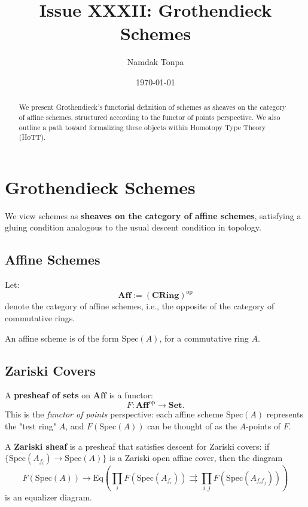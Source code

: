 \documentclass{article}
\begin{document}
\title{Issue XXXII: Grothendieck Schemes}
\author{Namdak Tonpa}
\date{\today}

\maketitle

\begin{abstract}
We present Grothendieck’s functorial definition of schemes as sheaves on the category of affine schemes, structured according to the functor of points perspective. We also outline a path toward formalizing these objects within Homotopy Type Theory (HoTT).
\end{abstract}

\section{Grothendieck Schemes}

We view schemes as \textbf{sheaves on the category of affine schemes}, satisfying a gluing condition analogous to the usual descent condition in topology.

\subsection{Affine Schemes}

Let:
\[
\mathbf{Aff} := (\mathbf{CRing})^{\mathrm{op}}
\]
denote the category of affine schemes, i.e., the opposite of the category of commutative rings.

An affine scheme is of the form $\mathrm{Spec}(A)$, for a commutative ring $A$.

\subsection{Zariski Covers}

A \textbf{presheaf of sets} on $\mathbf{Aff}$ is a functor:
\[
F : \mathbf{Aff}^{\mathrm{op}} \to \mathbf{Set}.
\]
This is the \emph{functor of points} perspective: each affine scheme $\mathrm{Spec}(A)$ represents the "test ring" $A$, and $F(\mathrm{Spec}(A))$ can be thought of as the $A$-points of $F$.

A \textbf{Zariski sheaf} is a presheaf that satisfies descent for Zariski covers: if $\{ \mathrm{Spec}(A_{f_i}) \to \mathrm{Spec}(A) \}$ is a Zariski open affine cover, then the diagram
\[
F(\mathrm{Spec}(A)) \to \mathrm{Eq} \left( \prod_i F(\mathrm{Spec}(A_{f_i})) \rightrightarrows \prod_{i,j} F(\mathrm{Spec}(A_{f_i f_j})) \right)
\]
is an equalizer diagram.
\end{document}
